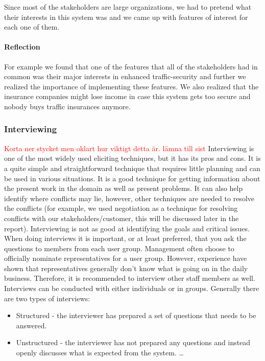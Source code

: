 \documentclass[10pt]{article}
\newcommand\todo[1]{\textcolor{red}{#1}}
\begin{document}
Since most of the stakeholders are large organizations, we had to pretend what their interests in this system was and we came up with features of interest for each one of them.
\paragraph{Reflection}
\hfill \break
For example we found that one of the features that all of the stakeholders had in common was their major interests in enhanced traffic-security and further we realized the importance of implementing these features. We also realized that the insurance companies might lose income in case this system gets too secure and nobody buys traffic insurances anymore.

\subsubsection{Interviewing}
\todo{Korta ner stycket men oklart hur viktigt detta är. lämna till sist}
Interviewing is one of the most widely used eliciting techniques, but it has its pros and cons. It is a quite simple and straightforward technique that requires little planning and can be used in various situations. It is a good technique for getting information about the present work in the domain as well as present problems. It can also help identify where conflicts may lie, however, other techniques are needed to resolve the conflicts (for example, we used negotiation as a technique for resolving conflicts with our stakeholders/customer, this will be discussed later in the report). Interviewing is not as good at identifying the goals and critical issues.
When doing interviews it is important, or at least preferred, that you ask the questions to members from each user group. Management often choose to officially nominate representatives for a user group. However, experience have shown that representatives generally don’t know what is going on in the daily business. Therefore, it is recommended to interview other staff members as well. Interviews can be conducted with either individuals or in groups.
Generally there are two types of interviews: 

\begin{itemize}
    \item Structured - the interviewer has prepared a set of questions that needs to be answered. 
    \item Unstructured - the interviewer has not prepared any questions and instead           openly discusses what is expected from the system. \ldots 
\end{itemize}
\end{document}
